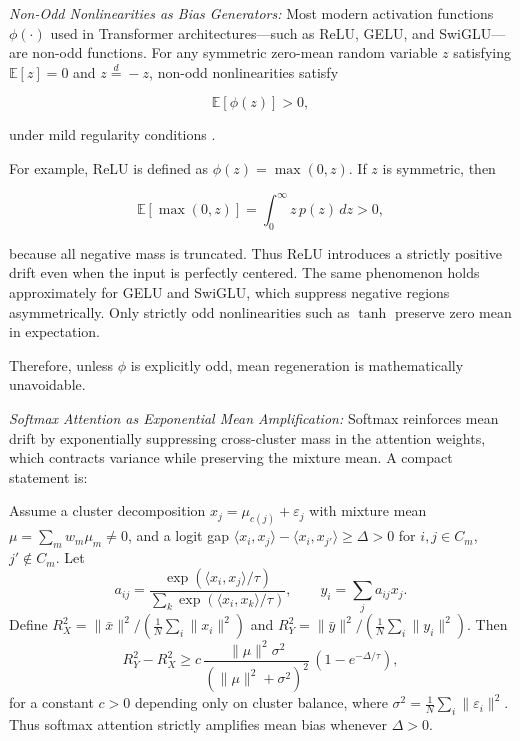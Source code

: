 \noindent \emph{Non-Odd Nonlinearities as Bias Generators:} Most modern activation functions $\phi(\cdot)$ used in
Transformer architectures—such as ReLU, GELU, and SwiGLU—
are non-odd functions.
For any symmetric zero-mean random variable $z$ satisfying
$\mathbb{E}[z] = 0$ and $z \overset{d}{=} -z$,
non-odd nonlinearities satisfy

\begin{equation}
\mathbb{E}[\phi(z)] > 0,
\label{eq:non_odd_bias}
\end{equation}

under mild regularity conditions
\cite{timkey2021rogue,puccetti2022frequency}.

For example, ReLU is defined as $\phi(z) = \max(0,z)$.
If $z$ is symmetric, then

\begin{equation}
\mathbb{E}[\max(0,z)]
=
\int_{0}^{\infty} z\, p(z)\, dz
>
0,
\end{equation}

because all negative mass is truncated.
Thus ReLU introduces a strictly positive drift even when
the input is perfectly centered.
The same phenomenon holds approximately for GELU and SwiGLU,
which suppress negative regions asymmetrically.
Only strictly odd nonlinearities such as $\tanh$
preserve zero mean in expectation.

Therefore, unless $\phi$ is explicitly odd,
mean regeneration is mathematically unavoidable.

\noindent \emph{Softmax Attention as Exponential Mean Amplification:}
Softmax reinforces mean drift by exponentially suppressing cross-cluster
mass in the attention weights, which contracts variance while preserving
the mixture mean. A compact statement is:

\begin{theorem}
\label{thm:exponential_amplification}
Assume a cluster decomposition $x_j=\mu_{c(j)}+\varepsilon_j$ with mixture mean
$\mu=\sum_m w_m\mu_m\neq 0$, and a logit gap
$\langle x_i,x_j\rangle-\langle x_i,x_{j'}\rangle\ge\Delta>0$ for
$i,j\in C_m$, $j'\notin C_m$. Let
\[
a_{ij}=\frac{\exp(\langle x_i,x_j\rangle/\tau)}{\sum_k \exp(\langle x_i,x_k\rangle/\tau)},
\qquad y_i=\sum_j a_{ij}x_j.
\]
Define $R_X^2=\|\bar x\|^2/(\frac1N\sum_i\|x_i\|^2)$ and
$R_Y^2=\|\bar y\|^2/(\frac1N\sum_i\|y_i\|^2)$. Then
\[
R_Y^2-R_X^2 \ge
c\,\frac{\|\mu\|^2\sigma^2}{(\|\mu\|^2+\sigma^2)^2}\,(1-e^{-\Delta/\tau}),
\]
for a constant $c>0$ depending only on cluster balance, where
$\sigma^2=\frac1N\sum_i\|\varepsilon_i\|^2$.
Thus softmax attention strictly amplifies mean bias whenever $\Delta>0$.
\end{theorem}

